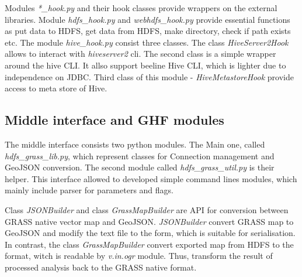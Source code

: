 \documentclass[a4paper,12pt,oneside]{report}
\begin{document}
Modules \textit{*\_hook.py} and their hook classes provide wrappers on the external libraries. Module \textit{hdfs\_hook.py} and \textit{webhdfs\_hook.py} provide essential functions as put data to HDFS, get data from HDFS, make directory, check if path exists etc. 
The module \textit{ hive\_hook.py} consist three classes. The class \textit{HiveServer2Hook} allows to interact with \textit{hiveserver2} cli. The second class is a simple wrapper around the hive CLI. It allso support beeline Hive CLI, which is lighter due to independence on JDBC. Third class of this module -  \textit{HiveMetastoreHook} provide access to meta store of Hive. 

\subsection{Middle interface and GHF modules}
The middle interface consists two python modules. The Main one, called \textit{hdfs\_grass\_lib.py}, which represent classes for Connection management and GeoJSON conversion.  The second module called \textit{hdfs\_grass\_util.py} is their helper. This interface allowed to developed simple command lines modules, which mainly include parser for parameters and flags.  

Class \textit{JSONBuilder} and class \textit{GrassMapBuilder} are API for conversion between GRASS native vector map and GeoJSON.  \textit{JSONBuilder} convert GRASS map to GeoJSON and modify the text file to the form, which is suitable for serialisation. In contrast, the class \textit{GrassMapBuilder} convert exported map from HDFS to the format, witch is readable by \textit{v.in.ogr} module. Thus, transform the result of processed analysis back to the GRASS native format.
\end{document}
